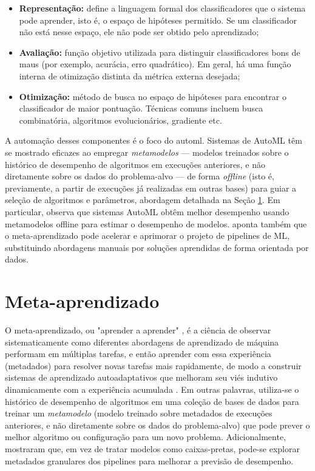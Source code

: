 \begin{itemize}
  \item \textbf{Representação:} define a linguagem formal dos classificadores que o sistema pode aprender, isto é, o espaço de hipóteses permitido. Se um classificador não está nesse espaço, ele não pode ser obtido pelo aprendizado;
  \item \textbf{Avaliação:} função objetivo utilizada para distinguir classificadores bons de maus (por exemplo, acurácia, erro quadrático). Em geral, há uma função interna de otimização distinta da métrica externa desejada;
  \item \textbf{Otimização:} método de busca no espaço de hipóteses para encontrar o classificador de maior pontuação. Técnicas comuns incluem busca combinatória, algoritmos evolucionários, gradiente etc.
\end{itemize}

A automação desses componentes é o foco do \gls{automl}. Sistemas de AutoML têm se mostrado eficazes ao empregar \emph{metamodelos} — modelos treinados sobre o histórico de desempenho de algoritmos em execuções anteriores, e não diretamente sobre os dados do problema-alvo — de forma \emph{offline} (isto é, previamente, a partir de execuções já realizadas em outras bases) para guiar a seleção de algoritmos e parâmetros, abordagem detalhada na Seção \ref{sec:metaaprendizado}. Em particular,  observa que sistemas AutoML obtêm melhor desempenho usando metamodelos offline para estimar o desempenho de modelos.  aponta também que o meta-aprendizado pode acelerar e aprimorar o projeto de pipelines de ML, substituindo abordagens manuais por soluções aprendidas de forma orientada por dados.

\section{Meta-aprendizado}\label{sec:metaaprendizado}
O meta-aprendizado, ou "aprender a aprender" , é a ciência de observar sistematicamente como diferentes abordagens de aprendizado de máquina performam em múltiplas tarefas, e então aprender com essa experiência (metadados) para resolver novas tarefas mais rapidamente, de modo a construir sistemas de aprendizado autoadaptativos que melhoram seu viés indutivo dinamicamente com a experiência acumulada . Em outras palavras, utiliza-se o histórico de desempenho de algoritmos em uma coleção de bases de dados para treinar um \emph{metamodelo} (modelo treinado sobre metadados de execuções anteriores, e não diretamente sobre os dados do problema-alvo) que pode prever o melhor algoritmo ou configuração para um novo problema. Adicionalmente,  mostraram que, em vez de tratar modelos como caixas-pretas, pode-se explorar metadados granulares dos pipelines para melhorar a previsão de desempenho.

